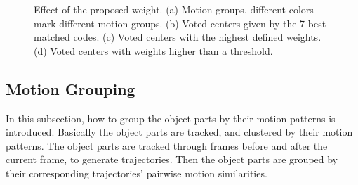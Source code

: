 \documentclass{mva2011}
\begin{document}
\begin{figure}
\centering
{}
\caption{Effect of the proposed weight. (a) Motion groups, different colors mark different motion groups. (b) Voted centers given by the 7 best matched codes. (c) Voted centers with the highest defined weights. (d) Voted centers with weights higher than a threshold.}
\label{fig:compa}
\end{figure}

\subsection{Motion Grouping}
In this subsection, how to group the object parts by their motion patterns is introduced. Basically the object parts are tracked, and clustered by their motion patterns. The object parts are tracked through frames before and after the current frame, to generate trajectories. Then the object parts are grouped by their corresponding trajectories' pairwise motion similarities.
\end{document}
